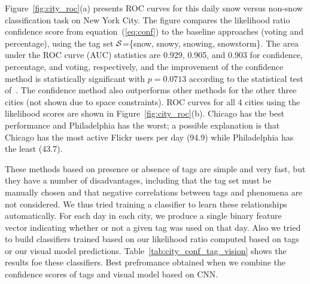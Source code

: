 \documentclass[10pt,journal,compsoc]{IEEEtran}
\begin{document}
Figure~\ref{fig:city_roc}(a) presents ROC curves for this
daily snow versus non-snow classification task on New York City. The figure compares the likelihood
ratio confidence score from equation~(\ref{eq:conf}) to the baseline
approaches (voting and percentage), using the tag set
${\cal S}$=\{snow, snowy, snowing, snowstorm\}.
The area under the ROC curve (AUC) statistics are 0.929, 0.905, and 0.903 for confidence, percentage, and voting, respectively, 
and the improvement of the confidence method is statistically significant 
with $p=0.0713$ according to the statistical test of~\cite{auc}.
The confidence method also outperforms other methods for the other three cities (not shown due to
space constraints).  ROC curves for all 4 cities using the likelihood
scores are shown in Figure~\ref{fig:city_roc}(b). Chicago has the best
performance and Philadelphia has the worst; a possible explanation
is that Chicago has the most active Flickr users per
day (94.9) while Philadelphia has the least (43.7).

These methods based on presence or absence of tags are simple and very
fast, but they have a number of disadvantages, including that the tag
set must be manually chosen and that negative correlations between
tags and phenomena are not considered.
We thus tried training a classifier to learn these relationships automatically.
For each day in each city, we produce a single binary feature vector indicating whether 
or not a given tag was used on that day. Also we tried to build classifiers trained based on our likelihood ratio computed based on tags or our visual model predictions. Table~\ref{tab:city_conf_tag_vision} shows the results foe these classifiers. Best prefromance obtained when we combine the confidence scores of tags and visual model based on CNN.
\end{document}
